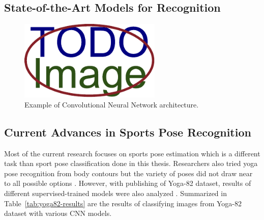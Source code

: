 \subsection{State-of-the-Art Models for Recognition}

\blindtext




\begin{figure}[ht]\centering
    \centering
    \includegraphics[width=\linewidth,height=1.5in]{figures/placeholder.pdf}
    \caption{Example of Convolutional Neural Network architecture.}
    \label{fig:cnn-example}
\end{figure}

\subsection{Current Advances in Sports Pose Recognition}

Most of the current research focuses on sports pose estimation which is a different task than sport pose classification done in this thesis. Researchers also tried yoga pose recognition from body contours but the variety of poses did not draw near to all possible options \cite{yoga-posture-recognition}. However, with publishing of Yoga-82 dataset, results of different supervised-trained models were also analyzed \cite{verma2020yoga}. Summarized in Table~\ref{tab:yoga82-results} are the results of classifying images from Yoga-82 dataset with various CNN models.

